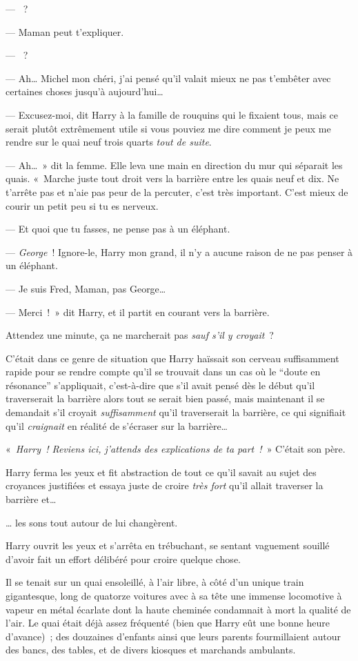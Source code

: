 --- ~?

--- Maman peut t'expliquer.

--- ~?

--- Ah… Michel mon chéri, j'ai pensé qu'il valait mieux ne pas t'embêter avec certaines choses jusqu'à aujourd'hui…

--- Excusez-moi, dit Harry à la famille de rouquins qui le fixaient tous, mais ce serait plutôt extrêmement utile si vous pouviez me dire comment je peux me rendre sur le quai neuf trois quarts \emph{tout de suite}.

--- Ah…~» dit la femme. Elle leva une main en direction du mur qui séparait les quais.
«~Marche juste tout droit vers la barrière entre les quais neuf et dix. Ne t'arrête pas et n'aie pas peur de la percuter, c'est très important. C'est mieux de courir un petit peu si tu es nerveux.

--- Et quoi que tu fasses, ne pense pas à un éléphant.

--- \emph{George}~! Ignore-le, Harry mon grand, il n'y a aucune raison de ne pas penser à un éléphant.

--- Je suis Fred, Maman, pas George…

--- Merci~!~» dit Harry, et il partit en courant vers la barrière.

Attendez une minute, ça ne marcherait pas \emph{sauf s'il y croyait}~?

C'était dans ce genre de situation que Harry haïssait son cerveau suffisamment rapide pour se rendre compte qu'il se trouvait dans un cas où le “doute en résonance” s'appliquait, c'est-à-dire que s'il avait pensé dès le début qu'il traverserait la barrière alors tout se serait bien passé, mais maintenant il se demandait s'il croyait \emph{suffisamment} qu'il traverserait la barrière, ce qui signifiait qu'il \emph{craignait} en réalité de s'écraser sur la barrière…

«~\emph{Harry~! Reviens ici, j'attends des explications de ta part~!}~» C'était son père.

Harry ferma les yeux et fit abstraction de tout ce qu'il savait au sujet des croyances justifiées et essaya juste de croire \emph{très fort} qu'il allait traverser la barrière et…

… les sons tout autour de lui changèrent.

Harry ouvrit les yeux et s'arrêta en trébuchant, se sentant vaguement souillé d'avoir fait un effort délibéré pour croire quelque chose.

Il se tenait sur un quai ensoleillé, à l'air libre, à côté d'un unique train gigantesque, long de quatorze voitures avec à sa tête une immense locomotive à vapeur en métal écarlate dont la haute cheminée condamnait à mort la qualité de l'air.
Le quai était déjà assez fréquenté (bien que Harry eût une bonne heure d'avance)~; des douzaines d'enfants ainsi que leurs parents fourmillaient autour des bancs, des tables, et de divers kiosques et marchands ambulants.

